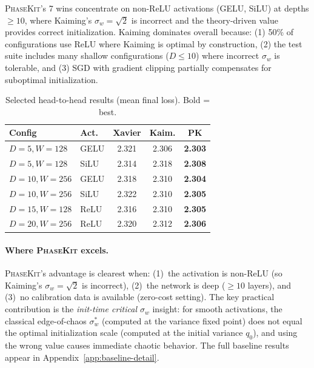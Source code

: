\documentclass[10pt]{article}
\newcommand{\ToolName}{\textsc{PhaseKit}}
\begin{document}
\ToolName{}'s 7 wins concentrate on non-ReLU activations (GELU, SiLU) at depths $\geq 10$, where Kaiming's $\sigma_w = \sqrt{2}$ is incorrect and the theory-driven value provides correct initialization.
Kaiming dominates overall because: (1) 50\% of configurations use ReLU where Kaiming is optimal by construction, (2) the test suite includes many shallow configurations ($D \leq 10$) where incorrect $\sigma_w$ is tolerable, and (3) SGD with gradient clipping partially compensates for suboptimal initialization.

\begin{table}[t]
\centering
\caption{Selected head-to-head results (mean final loss). Bold = best.}
\label{tab:baseline-comparison}
\small
\begin{tabular}{@{}llccc@{}}
\toprule
\textbf{Config} & \textbf{Act.} & \textbf{Xavier} & \textbf{Kaim.} & \textbf{PK} \\
\midrule
$D\!=\!5, W\!=\!128$  & GELU & 2.321 & 2.306 & \textbf{2.303} \\
$D\!=\!5, W\!=\!128$  & SiLU & 2.314 & 2.318 & \textbf{2.308} \\
$D\!=\!10, W\!=\!256$ & GELU & 2.318 & 2.310 & \textbf{2.304} \\
$D\!=\!10, W\!=\!256$ & SiLU & 2.322 & 2.310 & \textbf{2.305} \\
$D\!=\!15, W\!=\!128$ & ReLU & 2.316 & 2.310 & \textbf{2.305} \\
$D\!=\!20, W\!=\!256$ & ReLU & 2.320 & 2.312 & \textbf{2.306} \\
\bottomrule
\end{tabular}
\end{table}

\paragraph{Where \ToolName{} excels.}
\ToolName{}'s advantage is clearest when: (1)~the activation is non-ReLU (so Kaiming's $\sigma_w = \sqrt{2}$ is incorrect), (2)~the network is deep ($\geq 10$ layers), and (3)~no calibration data is available (zero-cost setting).
The key practical contribution is the \emph{init-time critical $\sigma_w$} insight: for smooth activations, the classical edge-of-chaos $\sigma_w^*$ (computed at the variance fixed point) does not equal the optimal initialization scale (computed at the initial variance $q_0$), and using the wrong value causes immediate chaotic behavior.
The full baseline results appear in Appendix~\ref{app:baseline-detail}.
\end{document}
